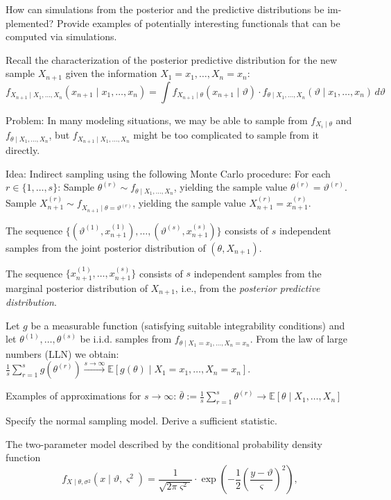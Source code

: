 How can simulations from the posterior and the predictive distributions be im-
plemented? Provide examples of potentially interesting functionals that can be
computed via simulations.

Recall the characterization of the posterior predictive distribution for the new sample \( X_{n+1} \) given the information 
\( X_1 = x_1, \ldots, X_n = x_n \):
\[
f_{X_{n+1} \mid X_1, \ldots, X_n}(x_{n+1} \mid x_1, \ldots, x_n) = \int f_{X_{n+1} \mid \theta}(x_{n+1} \mid \vartheta) \cdot f_{\theta \mid X_1, \ldots, X_n}(\vartheta \mid x_1, \ldots, x_n) \, d\vartheta
\]

Problem: In many modeling situations, we may be able to sample from \( f_{X_i \mid \theta} \) and \( f_{\theta \mid X_1, \ldots, X_n} \), 
but \( f_{X_{n+1} \mid X_1, \ldots, X_n} \) might be too complicated to sample from it directly.

Idea: Indirect sampling using the following Monte Carlo procedure: For each \( r \in \{ 1, \ldots, s \} \):
Sample \( \theta^{(r)} \sim f_{\theta \mid X_1, \ldots, X_n} \), yielding the sample value \( \theta^{(r)} = \vartheta^{(r)} \).
Sample \( X_{n+1}^{(r)} \sim f_{X_{n+1} \mid \theta = \vartheta^{(r)}} \), yielding the sample value \( X_{n+1}^{(r)} = x_{n+1}^{(r)} \).

The sequence \(\{ (\vartheta^{(1)}, x_{n+1}^{(1)}), \ldots, (\vartheta^{(s)}, x_{n+1}^{(s)}) \} \) consists of \( s \) independent samples from 
the joint posterior distribution of \( (\theta, X_{n+1}) \).

The sequence \(\{ x_{n+1}^{(1)}, \ldots, x_{n+1}^{(s)} \} \) consists of \( s \) independent samples from the marginal
posterior distribution of \( X_{n+1} \), i.e., from the \emph{posterior predictive distribution}.

Let \(g\) be a measurable function (satisfying suitable integrability conditions) and let \( \theta^{(1)}, \ldots, \theta^{(s)} \) be i.i.d. samples
from \(f_{\theta \mid X_1 = x_1, \ldots, X_n = x_n}.\) From the law of large numbers (LLN) we obtain:
\(\frac{1}{s} \sum_{r=1}^{s} g(\theta^{(r)}) \xrightarrow{s \to \infty} \mathbb{E}[g(\theta) \mid X_1 = x_1, \ldots, X_n = x_n].\)

Examples of approximations for \( s \to \infty \):
\(\bar{\theta} := \frac{1}{s}\sum_{r=1}^{s} \theta^{(r)} \to \mathbb{E}[\theta \mid X_1, \ldots, X_n]\)


Specify the normal sampling model. Derive a sufficient statistic.

The two-parameter model described by the conditional probability density function
\[
f_{X \mid \theta, \sigma^2}(x \mid \vartheta, \varsigma^2) = \frac{1}{\sqrt{2 \pi \varsigma^2}} \cdot \exp \left( -\frac{1}{2} \left( \frac{y - \vartheta}{\varsigma} \right)^2 \right),
\]

